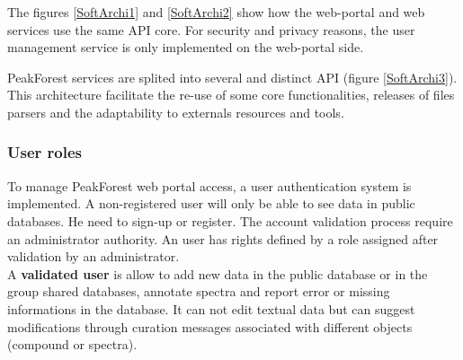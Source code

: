 The figures \ref{SoftArchi1} and \ref{SoftArchi2} show how the web-portal and web services use the same API core. 
For security and privacy reasons, the user management service is only implemented on the web-portal side.

PeakForest services are splited into several and distinct API (\cf figure \ref{SoftArchi3}). This architecture facilitate the re-use of some core functionalities, releases of files parsers and the adaptability to externals resources and tools.

\begin{figure}[htbp]
	\centering
\end{figure}

\subsubsection{User roles}

To manage PeakForest web portal access, a user authentication system is implemented. A non-registered user will only be able to see data in public databases. He need to sign-up or register. The account validation process require an administrator authority. 
An user has rights defined by a role assigned after validation by an administrator.\\

A \textbf{validated user} is allow to add new data in the public database or in the group shared databases, annotate spectra and report error or missing informations in the database. It can not edit textual data but can suggest modifications through curation messages associated with different objects (compound or spectra).\\

